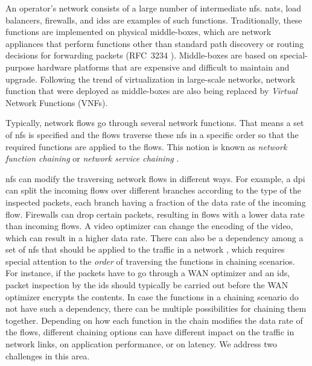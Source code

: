 \documentclass[10pt,a4paper,conference]{IEEEtran}
\begin{document}
An operator's network consists of a large number of intermediate \acp{nf}. 
\acp{nat}, load balancers, firewalls, and \acp{ids} are
examples of such functions.
Traditionally, these functions are implemented on physical middle-boxes, which are 
network appliances that perform functions other
than standard path discovery or routing decisions for forwarding packets (RFC~3234 \cite{Carpenter2002}).
Middle-boxes are based on special-purpose hardware platforms
that are expensive and difficult to maintain and upgrade. Following the trend 
of virtualization in large-scale networks, network function that were deployed as 
middle-boxes are also being replaced by \emph{Virtual} Network Functions (VNFs). 

Typically, network flows go through several network functions. That means 
a set of \acp{nf} is specified and the flows traverse these \acp{nf} 
in a specific order so that the required functions are applied to the flows. This
notion is known as \emph{network function chaining} or \emph{network service chaining}
\cite{schneiderstandardizations, draft-ietf-sfc-problem-statement-05}.

\acp{nf} can modify the traversing network flows in different ways. 
For example, a \ac{dpi} can split the incoming flows over different branches 
according to the type of the inspected packets, each branch having a fraction of 
the data rate of the incoming flow. Firewalls can drop certain packets, 
resulting in flows with a lower data rate than incoming flows. A video optimizer 
can change the encoding of the video, which can result in a higher data rate. 
There can also be a dependency among a set of \acp{nf} that should be applied 
to the traffic in a network \cite{Sekar2011}, which requires special attention 
to the \emph{order} of traversing the functions in chaining 
scenarios. For instance, if the packets have to go through a WAN optimizer and an \ac{ids}, 
packet inspection by the \ac{ids} should typically be carried out before the WAN optimizer 
encrypts the contents. In case the functions in a chaining scenario do 
not have such a dependency, there can be multiple possibilities for chaining them 
together. Depending on how each function in the chain modifies the data rate of 
the flows, different chaining options can have different impact on the traffic 
in network links, on application performance, or on latency. We address two 
challenges in this area.  
\end{document}
